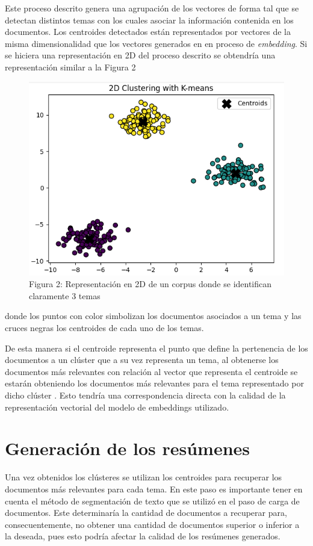     Este proceso descrito genera una agrupación de los vectores de forma tal que se detectan distintos temas con los cuales asociar la información contenida en los documentos. Los centroides detectados están representados por vectores de la misma dimensionalidad que los vectores generados en en proceso de \emph{embedding}. Si se hiciera una representación en 2D del proceso descrito se obtendría una representación similar a la Figura 2 
    \begin{figure}
        \centering
        \includegraphics[scale = 0.7]{Figures/clustering.png}
        \caption*{Figura 2: Representación en 2D de un corpus donde se identifican claramente 3 temas}
    \end{figure}
    donde los puntos con color simbolizan los documentos asociados a un tema  y las cruces negras los centroides de cada uno de los temas.

    De esta manera si el centroide representa el punto que define la pertenencia de los documentos a un clúster  que a su vez representa un tema, al obtenerse los documentos más relevantes con relación al vector que representa el centroide se estarán obteniendo los documentos más relevantes para el tema representado por dicho clúster . Esto tendría una correspondencia directa con la calidad de la representación vectorial del modelo de embeddings utilizado.
\section{Generación de los resúmenes}
    Una vez obtenidos los clústeres  se utilizan los centroides para recuperar los documentos más relevantes para cada tema. En este paso es importante tener en cuenta el método de segmentación de texto que se utilizó en el paso de carga de documentos. Este determinaría la cantidad de documentos a recuperar para, consecuentemente, no obtener una cantidad de documentos superior o inferior a la deseada, pues esto podría afectar la calidad de los resúmenes generados.
    
